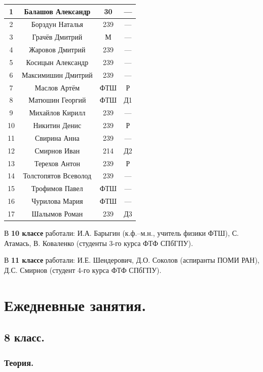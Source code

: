 \documentclass[11pt]{article}
\newlength{\h}
\newlength{\x}
\begin{document}
\begin{table}[ht]
\begin{minipage}[t]{0.45\linewidth}
\begin{tabular}[h]{|c|c|c|c|}
      \hline
      1 & Балашов Александр & 30 & ---  \\ \hline
      2 & Борздун Наталья & 239 & ---  \\ \hline
      3 & Грачёв Дмитрий & М & ---  \\ \hline
      4 & Жаровов Дмитрий & 239 & ---  \\ \hline
      5 & Косицын Александр & 239 & ---  \\ \hline
      6 & Максимишин Дмитрий & 239 & ---  \\ \hline
      7 & Маслов Артём & ФТШ & Р  \\ \hline
      8 & Матюшин Георгий & ФТШ & Д1  \\ \hline
      9 & Михайлов Кирилл & 239 & ---  \\ \hline
      10 & Никитин Денис & 239 & Р  \\ \hline
      11 & Свирина Анна & 239 & ---  \\ \hline
      12 & Смирнов Иван & 214 & Д2  \\ \hline
      13 & Терехов Антон & 239 & Р  \\ \hline
      14 & Толстопятов Всеволод & 239 & ---  \\ \hline
      15 & Трофимов Павел & ФТШ & ---  \\ \hline
      16 & Чурилова Мария & ФТШ & ---  \\ \hline
      17 & Шалымов Роман & 239 & Д3  \\ \hline
    \end{tabular}
  \end{minipage}
\end{table}

В \textbf{10 классе} работали: И.А. Барыгин (к.ф.--м.н., учитель
физики ФТШ), С. Атамась, В. Коваленко (студенты 3-го курса ФТФ
СПбГПУ).

В \textbf{11 классе} работали: И.Е. Шендерович, Д.О. Соколов
(аспиранты ПОМИ РАН), Д.С. Смирнов (студент 4-го курса ФТФ СПбГПУ). 

\section{Ежедневные занятия.}
\label{sec:daily}

\subsection{8 класс.}
\label{sec:daily8}

\subsubsection{Теория.}
\label{sec:th8}
\end{document}
